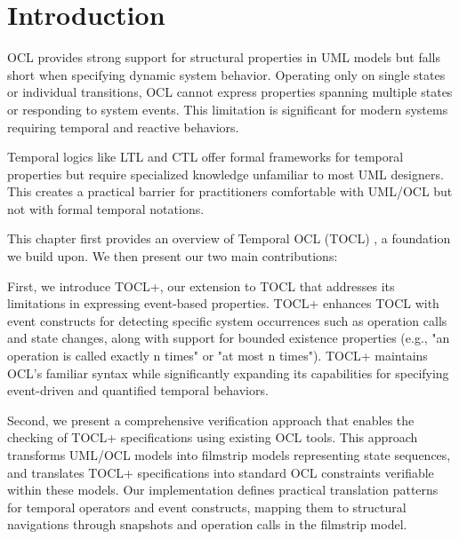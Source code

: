 \section{Introduction}

\hspace{1cm} OCL provides strong support for structural properties in UML models but 
falls short when specifying dynamic system behavior. Operating only on single states 
or individual transitions, OCL cannot express properties spanning multiple states or 
responding to system events. This limitation is significant for modern systems 
requiring temporal and reactive behaviors.

Temporal logics like LTL \cite{LTL} and CTL offer formal frameworks for temporal properties but 
require specialized knowledge unfamiliar to most UML designers. This creates a practical 
barrier for practitioners comfortable with UML/OCL but not with formal temporal notations.

This chapter first provides an overview of Temporal OCL (TOCL) \cite{TOCL}, a foundation we build upon. We then present our two main contributions:

First, we introduce TOCL+, our extension to TOCL that addresses its limitations in expressing event-based properties. TOCL+ enhances TOCL with event constructs for detecting specific system occurrences such as operation calls and state changes, along with support for bounded existence properties (e.g., "an operation is called exactly n times" or "at most n times"). TOCL+ maintains OCL's familiar syntax while significantly expanding its capabilities for specifying event-driven and quantified temporal behaviors.

Second, we present a comprehensive verification approach that enables the checking of TOCL+ specifications using existing OCL tools. This approach transforms UML/OCL models into filmstrip models representing state sequences, and translates TOCL+ specifications into standard OCL constraints verifiable within these models. Our implementation defines practical translation patterns for temporal operators and event constructs, mapping them to structural navigations through snapshots and operation calls in the filmstrip model.


